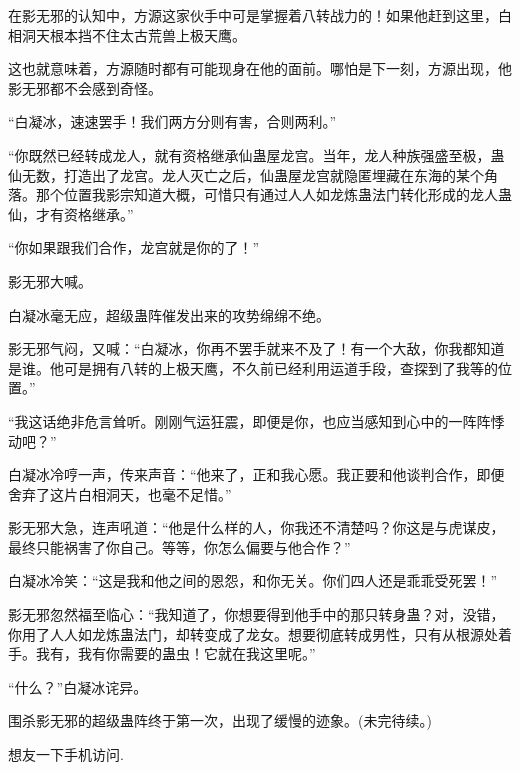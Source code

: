 \begin{this_body}
在影无邪的认知中，方源这家伙手中可是掌握着八转战力的！如果他赶到这里，白相洞天根本挡不住太古荒兽上极天鹰。

这也就意味着，方源随时都有可能现身在他的面前。哪怕是下一刻，方源出现，他影无邪都不会感到奇怪。

“白凝冰，速速罢手！我们两方分则有害，合则两利。”

“你既然已经转成龙人，就有资格继承仙蛊屋龙宫。当年，龙人种族强盛至极，蛊仙无数，打造出了龙宫。龙人灭亡之后，仙蛊屋龙宫就隐匿埋藏在东海的某个角落。那个位置我影宗知道大概，可惜只有通过人人如龙炼蛊法门转化形成的龙人蛊仙，才有资格继承。”

“你如果跟我们合作，龙宫就是你的了！”

影无邪大喊。

白凝冰毫无应，超级蛊阵催发出来的攻势绵绵不绝。

影无邪气闷，又喊：“白凝冰，你再不罢手就来不及了！有一个大敌，你我都知道是谁。他可是拥有八转的上极天鹰，不久前已经利用运道手段，查探到了我等的位置。”

“我这话绝非危言耸听。刚刚气运狂震，即便是你，也应当感知到心中的一阵阵悸动吧？”

白凝冰冷哼一声，传来声音：“他来了，正和我心愿。我正要和他谈判合作，即便舍弃了这片白相洞天，也毫不足惜。”

影无邪大急，连声吼道：“他是什么样的人，你我还不清楚吗？你这是与虎谋皮，最终只能祸害了你自己。等等，你怎么偏要与他合作？”

白凝冰冷笑：“这是我和他之间的恩怨，和你无关。你们四人还是乖乖受死罢！”

影无邪忽然福至临心：“我知道了，你想要得到他手中的那只转身蛊？对，没错，你用了人人如龙炼蛊法门，却转变成了龙女。想要彻底转成男性，只有从根源处着手。我有，我有你需要的蛊虫！它就在我这里呢。”

“什么？”白凝冰诧异。

围杀影无邪的超级蛊阵终于第一次，出现了缓慢的迹象。(未完待续。)

想友一下手机访问.

\end{this_body}

